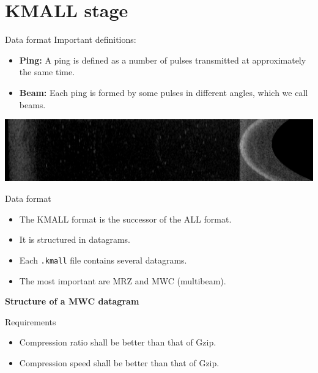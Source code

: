 \documentclass[usenames,dvipsnames]{beamer}
\begin{document}
\section{KMALL stage}
\begin{frame}{Data format}
Important definitions:
\begin{itemize}
	\item \textbf{Ping:} A ping is defined as a number of pulses transmitted at approximately the same time.
	\item \textbf{Beam:} Each ping is formed by some pulses in different angles, which we call beams.
\end{itemize}
\vspace{1em}

\includegraphics[scale=0.25]{graphics/water_column_amp.png}
\end{frame}

\begin{frame}{Data format}
\begin{itemize}
	\item<1-> The KMALL format is the successor of the ALL format.
	\item<1-> It is structured in datagrams.
	\item<1-> Each \texttt{.kmall} file contains several datagrams.
	\item<1-> The most important are MRZ and MWC (multibeam).
\end{itemize}
\vspace{1em}

\textbf{Structure of a MWC datagram}
\vspace{1em}

\scalebox{.42}{}
\end{frame}

\begin{frame}{Requirements}
\begin{itemize}
	\item<1-> Compression ratio shall be better than that of Gzip.
	\item<1-> Compression speed shall be better than that of Gzip.
\end{itemize}
\end{frame}
\end{document}
